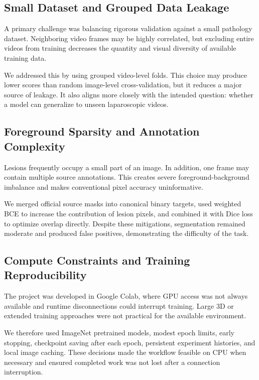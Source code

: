 \subsection{Small Dataset and Grouped Data Leakage}

A primary challenge was balancing rigorous validation against a small pathology dataset. Neighboring video frames may be highly correlated, but excluding entire videos from training decreases the quantity and visual diversity of available training data.

We addressed this by using grouped video-level folds. This choice may produce lower scores than random image-level cross-validation, but it reduces a major source of leakage. It also aligns more closely with the intended question: whether a model can generalize to unseen laparoscopic videos.

\subsection{Foreground Sparsity and Annotation Complexity}

Lesions frequently occupy a small part of an image. In addition, one frame may contain multiple source annotations. This creates severe foreground-background imbalance and makes conventional pixel accuracy uninformative.

We merged official source masks into canonical binary targets, used weighted BCE to increase the contribution of lesion pixels, and combined it with Dice loss to optimize overlap directly. Despite these mitigations, segmentation remained moderate and produced false positives, demonstrating the difficulty of the task.

\subsection{Compute Constraints and Training Reproducibility}

The project was developed in Google Colab, where GPU access was not always available and runtime disconnections could interrupt training. Large 3D or extended training approaches were not practical for the available environment.

We therefore used ImageNet pretrained models, modest epoch limits, early stopping, checkpoint saving after each epoch, persistent experiment histories, and local image caching. These decisions made the workflow feasible on CPU when necessary and ensured completed work was not lost after a connection interruption.

